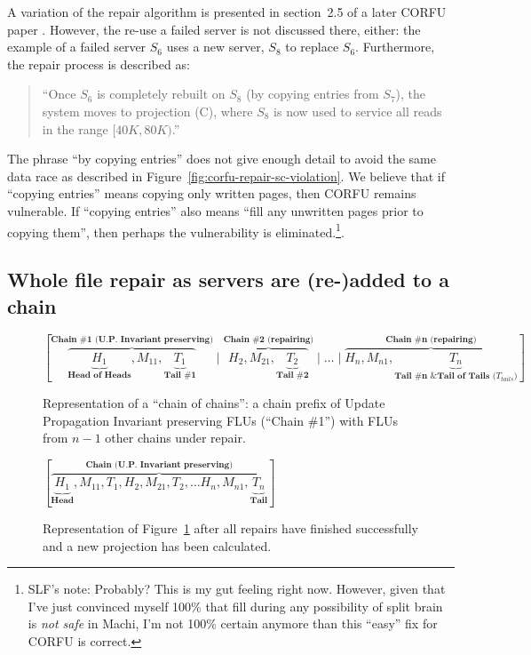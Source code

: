 \documentclass[preprint,10pt]{sigplanconf}
\begin{document}
A variation of the repair
algorithm is presented in section~2.5 of a later CORFU paper \cite{corfu2}.
However, the re-use a failed
server is not discussed there, either: the example of a failed server
$S_6$ uses a new server, $S_8$ to replace $S_6$.  Furthermore, the
repair process is described as:

\begin{quote}
``Once $S_6$ is completely rebuilt on $S_8$ (by copying entries from
  $S_7$), the system moves to projection (C), where $S_8$ is now used
  to service all reads in the range $[40K,80K)$.''
\end{quote}

The phrase ``by copying entries'' does not give enough
detail to avoid the same data race as described in
Figure~\ref{fig:corfu-repair-sc-violation}.  We believe that if
``copying entries'' means copying only written pages, then CORFU
remains vulnerable.  If ``copying entries'' also means ``fill any
unwritten pages prior to copying them'', then perhaps the
vulnerability is eliminated.\footnote{SLF's note: Probably?  This is my
  gut feeling right now.  However, given that I've just convinced
  myself 100\% that fill during any possibility of split brain is {\em
  not safe} in Machi, I'm not 100\% certain anymore than this ``easy''
  fix for CORFU is correct.}.

\subsection{Whole file repair as servers are (re-)added to a chain}
\label{sub:repair-add-to-chain}

\begin{figure}
\centering
$
[\overbrace{\underbrace{H_1}_\textbf{Head of Heads}, M_{11},
      \underbrace{T_1}_\textbf{Tail \#1}}^\textbf{Chain \#1 (U.P.~Invariant preserving)}
\mid
\overbrace{H_2, M_{21},
      \underbrace{T_2}_\textbf{Tail \#2}}^\textbf{Chain \#2 (repairing)}
\mid \ldots \mid
\overbrace{H_n, M_{n1},
      \underbrace{T_n}_\textbf{Tail \#n \& Tail of Tails ($T_{tails}$)}}^\textbf{Chain \#n (repairing)}
]
$
\caption{Representation of a ``chain of chains'': a chain prefix of
  Update Propagation Invariant preserving FLUs (``Chain \#1'')
  with FLUs from $n-1$ other chains under repair.}
\label{fig:repair-chain-of-chains}
\end{figure}

\begin{figure}
\centering
$
[\overbrace{\underbrace{H_1}_\textbf{Head}, M_{11}, T_1,
                        H_2, M_{21}, T_2,
                        \ldots
                        H_n, M_{n1},
                        \underbrace{T_n}_\textbf{Tail}}^\textbf{Chain (U.P.~Invariant preserving)}
]
$
\caption{Representation of Figure~\ref{fig:repair-chain-of-chains}
  after all repairs have finished successfully and a new projection has
  been calculated.}
\label{fig:repair-chain-of-chains-finished}
\end{figure}
\end{document}
